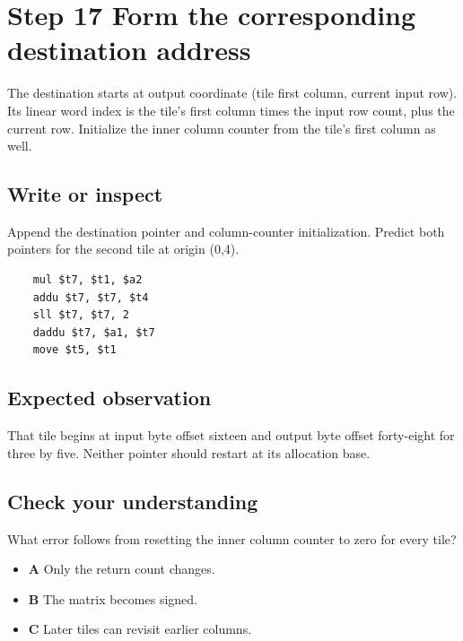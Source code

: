 \section{Step 17 Form the corresponding destination address}\label{transpose-s17}

The destination starts at output coordinate (tile first column, current input row). Its linear word index is the tile's first column times the input row count, plus the current row. Initialize the inner column counter from the tile's first column as well.

\subsection{Write or inspect}
Append the destination pointer and column-counter initialization. Predict both pointers for the second tile at origin (0,4).

\begin{verbatim}
    mul $t7, $t1, $a2
    addu $t7, $t7, $t4
    sll $t7, $t7, 2
    daddu $t7, $a1, $t7
    move $t5, $t1
\end{verbatim}

\subsection{Expected observation}
That tile begins at input byte offset sixteen and output byte offset forty-eight for three by five. Neither pointer should restart at its allocation base.

\subsection{Check your understanding}
What error follows from resetting the inner column counter to zero for every tile?

\begin{itemize}
  \item \textbf{A} Only the return count changes.
  \item \textbf{B} The matrix becomes signed.
  \item \textbf{C} Later tiles can revisit earlier columns.
\end{itemize}
